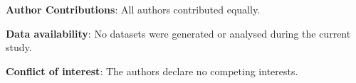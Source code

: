 \documentclass{article}
\makeatletter
\def\R{\mathbb{R}}
\def\E{\mathbb{E}}
\newtheorem{theorem}{Theorem}[section]
\newtheorem{lemma}[theorem]{Lemma}
\def\subsection{\@startsection{subsection}{2}{\z@}{3.25ex plus 1ex minus
		.2ex}{1.5ex plus .2ex}{\normalsize\bf}}
\makeatother
\begin{document}


  





\bigskip
\bigskip

\noindent\textbf{Author Contributions}: All authors contributed equally.

\noindent\textbf{Data availability}: No datasets were generated or analysed during the current study.

\noindent\textbf{Conflict of interest}: The authors declare no competing interests.\\




\end{document}
